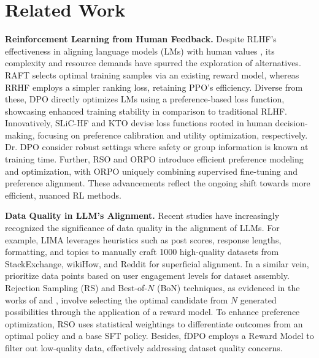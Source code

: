 \section{Related Work}
\label{Related Work}
\textbf{Reinforcement Learning from Human Feedback.}
Despite RLHF's effectiveness in aligning language models (LMs) with human values \cite{ChristianoLBMLA17, Bai2022training, llama2, instructGPT, fangjf2024neuron, FangZW00LWD024}, its complexity and resource demands have spurred the exploration of alternatives. RAFT \cite{RAFT} selects optimal training samples via an existing reward model, whereas RRHF \cite{RRHF} employs a simpler ranking loss, retaining PPO's efficiency. Diverse from these, DPO \cite{DPO} directly optimizes LMs using a preference-based loss function, showcasing enhanced training stability in comparison to traditional RLHF. Innovatively, SLiC-HF \cite{SLiC-HF} and KTO \cite{KTO} devise loss functions rooted in human decision-making, focusing on preference calibration and utility optimization, respectively. Dr. DPO \citep{drdpo} consider robust settings where safety or group information is known at training time. Further, RSO \cite{RSO} and ORPO \cite{ORPO} introduce efficient preference modeling and optimization, with ORPO uniquely combining supervised fine-tuning and preference alignment. These advancements reflect the ongoing shift towards more efficient, nuanced RL methods.

\textbf{Data Quality in LLM's Alignment.}
Recent studies have increasingly recognized the significance of data quality in the alignment of LLMs. For example, LIMA \cite{LIMA} leverages heuristics such as post scores, response lengths, formatting, and topics to manually craft 1000 high-quality datasets from StackExchange, wikiHow, and Reddit for superficial alignment. In a similar vein, \citet{Bai2022training} prioritize data points based on user engagement levels for dataset assembly. Rejection Sampling (RS) and Best-of-$N$ (BoN) techniques, as evidenced in the works of \citet{WebGPT} and \citet{Gao23ICML}, involve selecting the optimal candidate from $N$ generated possibilities through the application of a reward model. To enhance preference optimization, RSO \cite{RSO} uses statistical weightings to differentiate outcomes from an optimal policy and a base SFT policy. Besides, fDPO \cite{morimura2024filtered} employs a Reward Model to filter out low-quality data, effectively addressing dataset quality concerns.

